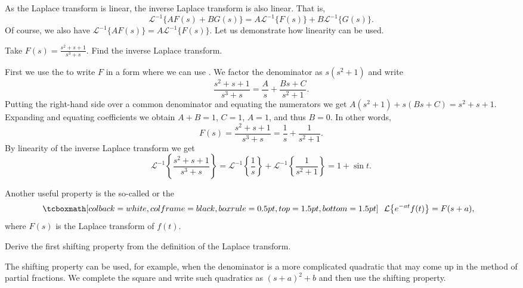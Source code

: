 As the Laplace transform is linear, the inverse Laplace
transform is also linear.  That is,
\begin{equation*}
{\mathcal{L}}^{-1} \bigl\{ A F(s) + B G(s) \bigr\} =
A {\mathcal{L}}^{-1} \bigl\{ F(s) \bigr\} +
B {\mathcal{L}}^{-1} \bigl\{ G(s) \bigr\} .
\end{equation*}
Of course, we also have
${\mathcal{L}}^{-1} \bigl\{ A F(s) \bigr\} =
A {\mathcal{L}}^{-1} \bigl\{ F(s) \bigr\}$.
Let us demonstrate how linearity can be used.

\begin{example}
Take
$F(s) = \frac{s^2+s+1}{s^3+s}$.  Find the inverse Laplace transform.

First we use the \emph{} to write $F$ in a form where
we can use .  We factor the denominator as
$s(s^2+1)$ and write
\begin{equation*}
\frac{s^2+s+1}{s^3+s}
=
\frac{A}{s} + 
\frac{Bs+C}{s^2+1} .
\end{equation*}
Putting the right-hand side over a common
denominator and equating the numerators we get
$A(s^2+1) + s(Bs+C) = s^2+s+1$.  Expanding and equating coefficients
we obtain $A+B = 1$, $C=1$, $A=1$,
and thus $B=0$.  In
other words,
\begin{equation*}
F(s) =
\frac{s^2+s+1}{s^3+s}
=
\frac{1}{s} +
\frac{1}{s^2+1} .
\end{equation*}
By linearity of the inverse Laplace transform we get 
\begin{equation*}
{\mathcal{L}}^{-1} \left\{ 
\frac{s^2+s+1}{s^3+s} \right\}
=
{\mathcal{L}}^{-1} \left\{ 
\frac{1}{s} \right\} 
+
{\mathcal{L}}^{-1} \left\{ 
\frac{1}{s^2+1} \right\}
=
1 + 
\sin t .
\end{equation*}
\end{example}

Another useful property is the 
so-called \emph{} or
the \emph{}
\begin{equation*}
\mybxbg{~~
\mathcal{L} \bigl\{ e^{-at} f(t) \bigr\} = F(s+a) ,
~~}
\end{equation*}
where $F(s)$ is the Laplace transform of $f(t)$.

\begin{exercise}
Derive the first shifting property
from the definition of the Laplace transform.
\end{exercise}

The shifting property can be used, for example, when the denominator is a
more complicated quadratic that may come up in the method of partial
fractions.  We complete the square and write such quadratics as ${(s+a)}^2+b$
and then use the shifting property.

